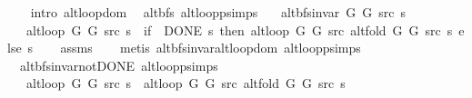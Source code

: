 \begin{isabellebody}
\ \ \isamarkupfalse%
\ {\isacharparenleft}{\kern0pt}intro\ alt{\isacharunderscore}{\kern0pt}loop{\isacharunderscore}{\kern0pt}dom{\isacharparenright}{\kern0pt}%
\endisatagproof
{\isafoldproof}%
%
\isadelimproof
\isanewline
%
\endisadelimproof
\isanewline
{}\isamarkupfalse%
\ {\isacharparenleft}{\kern0pt}\ alt{\isacharunderscore}{\kern0pt}bfs{\isacharparenright}{\kern0pt}\ alt{\isacharunderscore}{\kern0pt}loop{\isacharunderscore}{\kern0pt}psimps{\isacharcolon}{\kern0pt}\isanewline
\ \ \ {\isachardoublequoteopen}alt{\isacharunderscore}{\kern0pt}bfs{\isacharunderscore}{\kern0pt}invar{\isacharprime}{\kern0pt}\ G{}\ G{}\ src\ s{\isachardoublequoteclose}\isanewline
\ \ \ {\isachardoublequoteopen}alt{\isacharunderscore}{\kern0pt}loop\ G{}\ G{}\ src\ s\ {\isacharequal}{\kern0pt}\ {\isacharparenleft}{\kern0pt}if\ {\isasymnot}\ DONE\ s\ then\ alt{\isacharunderscore}{\kern0pt}loop\ G{}\ G{}\ src\ {\isacharparenleft}{\kern0pt}alt{\isacharunderscore}{\kern0pt}fold\ G{}\ G{}\ src\ s{\isacharparenright}{\kern0pt}\ else\ s{\isacharparenright}{\kern0pt}{\isachardoublequoteclose}\isanewline
%
\isadelimproof
\ \ %
\endisadelimproof
%
\isatagproof
{}\isamarkupfalse%
\ assms\isanewline
\ \ \isamarkupfalse%
\ {\isacharparenleft}{\kern0pt}metis\ alt{\isacharunderscore}{\kern0pt}bfs{\isacharunderscore}{\kern0pt}invar{\isachardot}{\kern0pt}alt{\isacharunderscore}{\kern0pt}loop{\isacharunderscore}{\kern0pt}dom\ alt{\isacharunderscore}{\kern0pt}loop{\isachardot}{\kern0pt}psimps{\isacharparenright}{\kern0pt}%
\endisatagproof
{\isafoldproof}%
%
\isadelimproof
\isanewline
%
\endisadelimproof
\isanewline
{}\isamarkupfalse%
\ {\isacharparenleft}{\kern0pt}\ alt{\isacharunderscore}{\kern0pt}bfs{\isacharunderscore}{\kern0pt}invar{\isacharunderscore}{\kern0pt}not{\isacharunderscore}{\kern0pt}DONE{\isacharparenright}{\kern0pt}\ alt{\isacharunderscore}{\kern0pt}loop{\isacharunderscore}{\kern0pt}psimps{\isacharcolon}{\kern0pt}\isanewline
\ \ \ {\isachardoublequoteopen}alt{\isacharunderscore}{\kern0pt}loop\ G{}\ G{}\ src\ s\ {\isacharequal}{\kern0pt}\ alt{\isacharunderscore}{\kern0pt}loop\ G{}\ G{}\ src\ {\isacharparenleft}{\kern0pt}alt{\isacharunderscore}{\kern0pt}fold\ G{}\ G{}\ src\ s{\isacharparenright}{\kern0pt}{\isachardoublequoteclose}\isanewline
%
\isadelimproof

\end{isabellebody}
